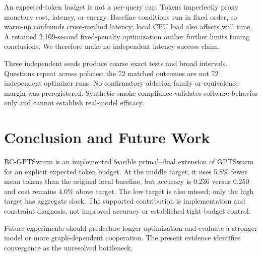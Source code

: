 \documentclass[journal]{IEEEtran}
\begin{document}
An expected-token budget is not a per-query cap. Tokens imperfectly proxy monetary cost, latency, or energy. Baseline conditions run in fixed order, so warm-up confounds cross-method latency; local CPU load also affects wall time. A retained 2,109-second fixed-penalty optimization outlier further limits timing conclusions. We therefore make no independent latency success claim.

Three independent seeds produce coarse exact tests and broad intervals. Questions repeat across policies; the 72 matched outcomes are not 72 independent optimizer runs. No confirmatory ablation family or equivalence margin was preregistered. Synthetic smoke compliance validates software behavior only and cannot establish real-model efficacy.

\section{Conclusion and Future Work}
BC-GPTSwarm is an implemented feasible primal--dual extension of GPTSwarm for an explicit expected token budget. At the middle target, it uses 5.8\% fewer mean tokens than the original local baseline, but accuracy is 0.236 versus 0.250 and cost remains 4.0\% above target. The low target is also missed; only the high target has aggregate slack. The supported contribution is implementation and constraint diagnosis, not improved accuracy or established tight-budget control.

Future experiments should predeclare longer optimization and evaluate a stronger model or more graph-dependent cooperation. The present evidence identifies convergence as the unresolved bottleneck.

\clearpage


\end{document}

